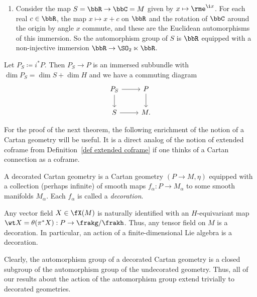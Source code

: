 \begin{example}
\begin{enumerate}
        \item Consider the map $S=\bbR\to \bbC=M$ given by $x\mapsto \rme^{\i x}$. For each real $c\in \bbR$, the map $x\mapsto x+c$ on $\bbR$ and the rotation of $\bbC$ around the origin by angle $x$ commute, and these are the Euclidean automorphisms of this immersion. So the automorphism group of $S$ is $\bbR$ equipped with a non-injective immersion $\bbR\to \SO_2\ltimes\bbR$.
    \end{enumerate}
\end{example}

Let $P_S\coloneqq i^\ast P$. Then $P_S\to P$ is an immersed subbundle with $\dim P_S=\dim S+\dim H$ and we have a commuting diagram 
\[\begin{tikzcd}
    P_S\arrow[r]\arrow[d] & P\arrow[d]\\
    S \arrow[r] & M.
\end{tikzcd}\]

For the proof of the next theorem, the following enrichment of the notion of a Cartan geometry will be useful. It is a direct analog of the notion of extended coframe from Definition~\ref{def extended coframe} if one thinks of a Cartan connection as a coframe.

\begin{defn}
    A decorated Cartan geometry is a Cartan geometry $(P\to M,\eta)$ equipped with a collection (perhaps infinite) of smooth maps $f_\alpha:P\to M_\alpha$ to some smooth manifolds $M_\alpha$. Each $f_\alpha$ is called a \emph{decoration}.
\end{defn}

\begin{example}
    Any vector field $X\in\fX(M)$ is naturally identified with an $H$-equivariant map $\wt X=\theta(\pi^\ast X):P\to \frakg\slash\frakh$. Thus, any tensor field on $M$ is a decoration. In particular, an action of a finite-dimensional Lie algebra is a decoration.
\end{example}

Clearly, the automorphism group of a decorated Cartan geometry is a closed subgroup of the automorphism group of the undecorated geometry. Thus, all of our results about the action of the automorphism group extend trivially to decorated geometries.

